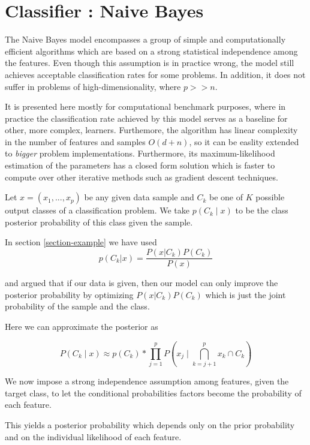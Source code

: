 \section{Classifier : Naive Bayes}

The Naive Bayes model encompasses a group of simple and computationally efficient algorithms which are based on a strong statistical independence among the features. Even though this assumption is in practice wrong, the model still achieves acceptable classification rates for some problems. In addition, it does not suffer in problems of high-dimensionality, where $p >> n$.

It is presented here mostly for computational benchmark purposes, where in practice the classification rate achieved by this model serves as a baseline for other, more complex, learners. Furthemore, the algorithm has linear  complexity in the number of features and samples $O(d+n)$, so it can be easlity extended to \textit{bigger} problem implementations. Furthermore, its maximum-likelihood estimation of the parameters has a closed form solution which is faster to compute over other iterative methods such as gradient descent techniques.

Let $x = (x_1,...,x_p)$ be any given data sample and $C_k$ be one of $K$ possible output classes of a classification problem. We take $p(C_k \mid x)$  to be the  class posterior probability of this class given the sample.

In section \ref{section-example}
we have used
\[
p(C_k| x) = \frac{P(x|C_k)P(C_k)}{P(x)}
\]\label{equation-posteriorProbabilties}

and argued that if our data is given, then our model can only improve the posterior probability by optimizing $P(x|C_k)P(C_k)$ which is just the joint probability of the sample and the class.

Here we can approximate the posterior as

\[
P(C_k \mid x) \approx p(C_k) * \prod_{j=1}^{p}    P(x_j \mid \bigcap_{k=j+1}^{p} x_k \cap C_k)
\]\label{equation-posteriorProbabilityDecomposition1}

We now impose a strong independence assumption among features, given the target class, to let the conditional probabilities factors become the probability of each feature. %

This yields a posterior probability which depends only on the prior probability and on the individual likelihood of each feature.

